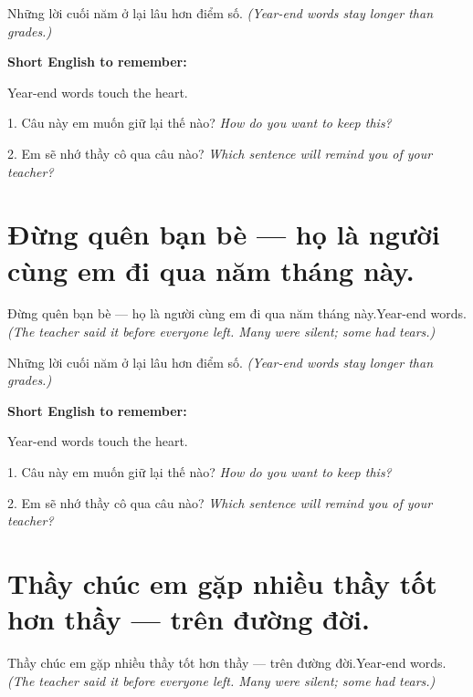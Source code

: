 \begin{baihoc}
Những lời cuối năm ở lại lâu hơn điểm số.
\textit{(Year-end words stay longer than grades.)}
\end{baihoc}

\begin{ghinhoanh}
\textbf{Short English to remember:}

Year-end words touch the heart.

\end{ghinhoanh}

\begin{tuhocnhanh}
1. Câu này em muốn giữ lại thế nào? \textit{How do you want to keep this?}

2. Em sẽ nhớ thầy cô qua câu nào? \textit{Which sentence will remind you of your teacher?}
\end{tuhocnhanh}
\ngancach


\section{Đừng quên bạn bè — họ là người cùng em đi qua năm tháng này.}
\begin{truyen}{Đừng quên bạn bè — họ là người cùng em đi qua năm tháng này.}{Year-end words.}
\textit{(The teacher said it before everyone left. Many were silent; some had tears.)}
\end{truyen}

\begin{baihoc}
Những lời cuối năm ở lại lâu hơn điểm số.
\textit{(Year-end words stay longer than grades.)}
\end{baihoc}

\begin{ghinhoanh}
\textbf{Short English to remember:}

Year-end words touch the heart.

\end{ghinhoanh}

\begin{tuhocnhanh}
1. Câu này em muốn giữ lại thế nào? \textit{How do you want to keep this?}

2. Em sẽ nhớ thầy cô qua câu nào? \textit{Which sentence will remind you of your teacher?}
\end{tuhocnhanh}
\ngancach


\section{Thầy chúc em gặp nhiều thầy tốt hơn thầy — trên đường đời.}
\begin{truyen}{Thầy chúc em gặp nhiều thầy tốt hơn thầy — trên đường đời.}{Year-end words.}
\textit{(The teacher said it before everyone left. Many were silent; some had tears.)}
\end{truyen}

